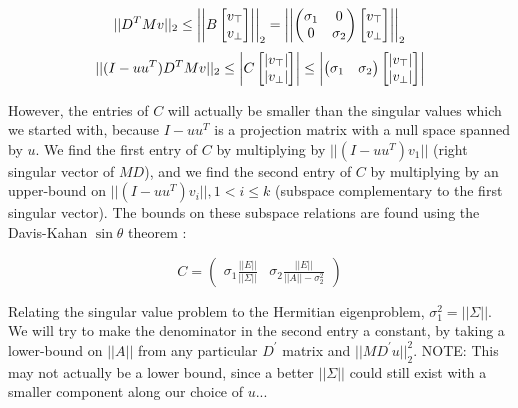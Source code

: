 \documentclass{article}
\def\tang{\ThisStyle{\abovebaseline[0pt]{\scalebox{-1}{$\SavedStyle\perp$}}}}
\begin{document}
$$
||D^TMv||_2 \le
\left|\left| B \left[
    \begin{matrix}
        v_{\tang} \\ v_\perp
    \end{matrix}
\right] \right|\right|_2
=
\left|\left| \left(
    \begin{matrix}
        \sigma_1 & 0 \\ 0 & \sigma_2
    \end{matrix}
\right) \left[
    \begin{matrix}
        v_{\tang} \\ v_\perp
    \end{matrix}
\right] \right|\right|_2 $$$$
||(I-uu^T)D^TMv||_2 \le
\left| C \left[
    \begin{matrix}
        |v_{\tang}| \\ |v_\perp|
    \end{matrix}
\right] \right|
\le
\left| \left(
    \begin{matrix}
        \sigma_1 & \sigma_2
    \end{matrix}
\right) \left[
    \begin{matrix}
        |v_{\tang}| \\ |v_\perp|
    \end{matrix}
\right] \right|
$$

However, the entries of $C$ will actually be smaller than the singular values which we started with, because $I-uu^T$ is a projection matrix with a null space spanned by $u$. We find the first entry of $C$ by multiplying by $||(I-uu^T)v_1||$ (right singular vector of $MD$), and we find the second entry of $C$ by multiplying by an upper-bound on $||(I-uu^T)v_i||, 1<i\le k$ (subspace complementary to the first singular vector). The bounds on these subspace relations are found using the Davis-Kahan $\sin\theta$ theorem \cite{davis1970rotation}:

$$
C =
\left(
    \begin{matrix}
        \sigma_1 \frac{||E||}{||\Sigma||}
        &
        \sigma_2 \frac{||E||}{||A|| - \sigma_2^2}
    \end{matrix}
\right)
$$

Relating the singular value problem to the Hermitian eigenproblem, $\sigma_1^2 = ||\Sigma||$. We will try to make the denominator in the second entry a constant, by taking a lower-bound on $||A||$ from any particular $D^\prime$ matrix and $||MD^\prime u||_2^2$. NOTE: This may not actually be a lower bound, since a better $||\Sigma||$ could still exist with a smaller component along our choice of $u$...
\end{document}
